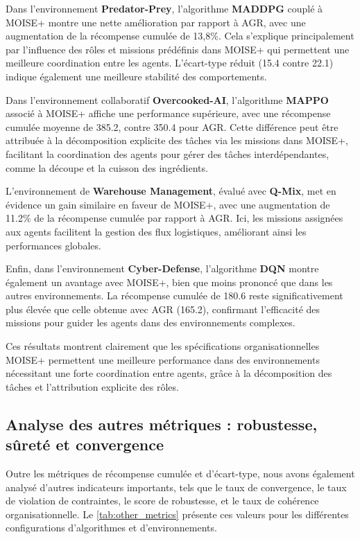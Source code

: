 \documentclass[sigconf,anonymous]{aamas}
\begin{document}
Dans l'environnement \textbf{Predator-Prey}, l'algorithme \textbf{MADDPG} couplé à MOISE+ montre une nette amélioration par rapport à AGR, avec une augmentation de la récompense cumulée de 13,8\%. Cela s'explique principalement par l'influence des rôles et missions prédéfinis dans MOISE+ qui permettent une meilleure coordination entre les agents. L'écart-type réduit (15.4 contre 22.1) indique également une meilleure stabilité des comportements.

Dans l'environnement collaboratif \textbf{Overcooked-AI}, l'algorithme \textbf{MAPPO} associé à MOISE+ affiche une performance supérieure, avec une récompense cumulée moyenne de 385.2, contre 350.4 pour AGR. Cette différence peut être attribuée à la décomposition explicite des tâches via les missions dans MOISE+, facilitant la coordination des agents pour gérer des tâches interdépendantes, comme la découpe et la cuisson des ingrédients.

L'environnement de \textbf{Warehouse Management}, évalué avec \textbf{Q-Mix}, met en évidence un gain similaire en faveur de MOISE+, avec une augmentation de 11.2\% de la récompense cumulée par rapport à AGR. Ici, les missions assignées aux agents facilitent la gestion des flux logistiques, améliorant ainsi les performances globales.

Enfin, dans l'environnement \textbf{Cyber-Defense}, l'algorithme \textbf{DQN} montre également un avantage avec MOISE+, bien que moins prononcé que dans les autres environnements. La récompense cumulée de 180.6 reste significativement plus élevée que celle obtenue avec AGR (165.2), confirmant l'efficacité des missions pour guider les agents dans des environnements complexes.

Ces résultats montrent clairement que les spécifications organisationnelles MOISE+ permettent une meilleure performance dans des environnements nécessitant une forte coordination entre agents, grâce à la décomposition des tâches et l'attribution explicite des rôles.

\subsection{Analyse des autres métriques : robustesse, sûreté et convergence}

Outre les métriques de récompense cumulée et d'écart-type, nous avons également analysé d'autres indicateurs importants, tels que le taux de convergence, le taux de violation de contraintes, le score de robustesse, et le taux de cohérence organisationnelle. Le \autoref{tab:other_metrics} présente ces valeurs pour les différentes configurations d'algorithmes et d'environnements.
\end{document}
